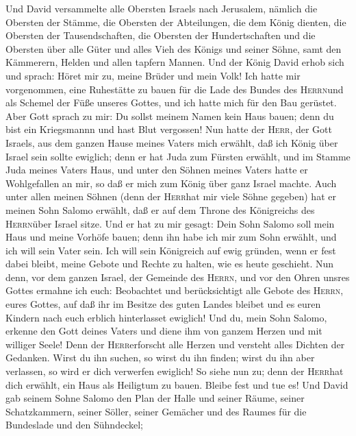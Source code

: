  Und David versammelte alle Obersten Israels nach
Jerusalem, nämlich die Obersten der Stämme, die Obersten der
Abteilungen, die dem König dienten, die Obersten der Tausendschaften,
die Obersten der Hundertschaften und die Obersten über alle Güter und
alles Vieh des Königs und seiner Söhne, samt den Kämmerern, Helden und
allen tapfern Mannen.  Und der König David erhob sich und
sprach: Höret mir zu, meine Brüder und mein Volk! Ich hatte mir
vorgenommen, eine Ruhestätte zu bauen für die Lade des Bundes des
\textsc{Herrn}und als Schemel der Füße unseres Gottes, und ich hatte
mich für den Bau gerüstet.  Aber Gott sprach zu mir: Du
sollst meinem Namen kein Haus bauen; denn du bist ein Kriegsmannn und
hast Blut vergossen!  Nun hatte der \textsc{Herr}, der
Gott Israels, aus dem ganzen Hause meines Vaters mich erwählt, daß ich
König über Israel sein sollte ewiglich; denn er hat Juda zum Fürsten
erwählt, und im Stamme Juda meines Vaters Haus, und unter den Söhnen
meines Vaters hatte er Wohlgefallen an mir, so daß er mich zum König
über ganz Israel machte.  Auch unter allen meinen Söhnen
(denn der \textsc{Herr}hat mir viele Söhne gegeben) hat er meinen Sohn
Salomo erwählt, daß er auf dem Throne des Königreichs des
\textsc{Herrn}über Israel sitze.  Und er hat zu mir
gesagt: Dein Sohn Salomo soll mein Haus und meine Vorhöfe bauen; denn
ihn habe ich mir zum Sohn erwählt, und ich will sein Vater sein.
 Ich will sein Königreich auf ewig gründen, wenn er fest
dabei bleibt, meine Gebote und Rechte zu halten, wie es heute geschieht.
 Nun denn, vor dem ganzen Israel, der Gemeinde des
\textsc{Herrn}, und vor den Ohren unsres Gottes ermahne ich euch:
Beobachtet und berücksichtigt alle Gebote des \textsc{Herrn}, eures
Gottes, auf daß ihr im Besitze des guten Landes bleibet und es euren
Kindern nach euch erblich hinterlasset ewiglich!  Und du,
mein Sohn Salomo, erkenne den Gott deines Vaters und diene ihm von
ganzem Herzen und mit williger Seele! Denn der \textsc{Herr}erforscht
alle Herzen und versteht alles Dichten der Gedanken. Wirst du ihn
suchen, so wirst du ihn finden; wirst du ihn aber verlassen, so wird er
dich verwerfen ewiglich!  So siehe nun zu; denn der
\textsc{Herr}hat dich erwählt, ein Haus als Heiligtum zu bauen. Bleibe
fest und tue es!  Und David gab seinem Sohne Salomo den
Plan der Halle und seiner Räume, seiner Schatzkammern, seiner Söller,
seiner Gemächer und des Raumes für die Bundeslade und den Sühndeckel;
